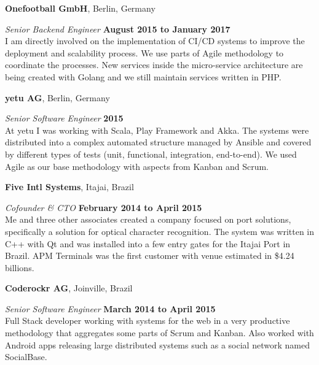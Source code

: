 \documentclass[12pt]{article}
\newcommand{\halfblankline}{\quad\vspace{-0.5\baselineskip}\pagebreak[3]}
\begin{document}
\halfblankline

\textbf{Onefootball GmbH},
Berlin, Germany
\begin{outerlist}

    \item[] \textit{Senior Backend Engineer}%
            \hfill \textbf{August 2015 to January 2017}\\
			I am directly involved on the implementation of CI/CD systems to improve the deployment and scalability process. We use parts of Agile methodology to coordinate the processes. New services inside the micro-service architecture are being created with Golang and we still maintain services written in PHP.
			
\end{outerlist}

\halfblankline

\textbf{yetu AG},
Berlin, Germany
\begin{outerlist}

    \item[] \textit{Senior Software Engineer}%
            \hfill \textbf{2015}\\
			At yetu I was working with Scala, Play Framework and Akka. The systems were distributed into a complex automated structure managed by Ansible and covered by different types of tests (unit, functional, integration, end-to-end). We used Agile as our base methodology with aspects from Kanban and Scrum.

\end{outerlist}

\halfblankline

\textbf{Five Intl Systems},
Itajai, Brazil
\begin{outerlist}

    \item[] \textit{Cofounder \& CTO}%
            \hfill \textbf{February 2014 to April 2015}\\
			Me and three other associates created a company focused on port solutions, specifically a solution for optical character recognition. The system was written in C++ with Qt and was installed into a few entry gates for the Itajai Port in Brazil. APM Terminals was the first customer with venue estimated in \$4.24 billions.
			
\end{outerlist}

\halfblankline

\textbf{Coderockr AG},
Joinville, Brazil
\begin{outerlist}

    \item[] \textit{Senior Software Engineer}%
            \hfill \textbf{March 2014 to April 2015}\\
			Full Stack developer working with systems for the web in a very productive methodology that aggregates some parts of Scrum and Kanban. Also worked with Android apps releasing large distributed systems such as a social network named SocialBase.
			
\end{outerlist}
\end{document}

